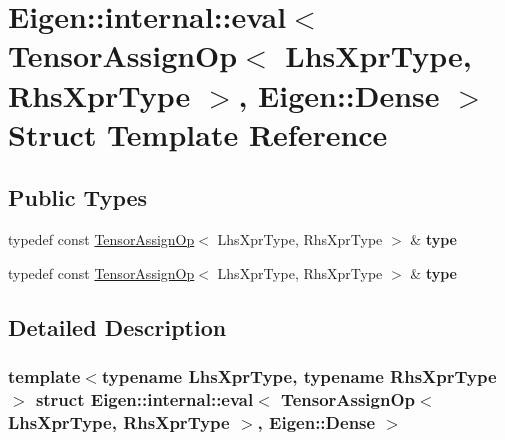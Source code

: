 \hypertarget{struct_eigen_1_1internal_1_1eval_3_01_tensor_assign_op_3_01_lhs_xpr_type_00_01_rhs_xpr_type_01_4_00_01_eigen_1_1_dense_01_4}{}\section{Eigen\+:\+:internal\+:\+:eval$<$ Tensor\+Assign\+Op$<$ Lhs\+Xpr\+Type, Rhs\+Xpr\+Type $>$, Eigen\+:\+:Dense $>$ Struct Template Reference}
\label{struct_eigen_1_1internal_1_1eval_3_01_tensor_assign_op_3_01_lhs_xpr_type_00_01_rhs_xpr_type_01_4_00_01_eigen_1_1_dense_01_4}
\subsection*{Public Types}
\begin{DoxyCompactItemize}
\item 
\mbox{\label{struct_eigen_1_1internal_1_1eval_3_01_tensor_assign_op_3_01_lhs_xpr_type_00_01_rhs_xpr_type_01_4_00_01_eigen_1_1_dense_01_4_ad5943d880c4f6f1d81767dff43e7659a}} 
typedef const \hyperlink{class_eigen_1_1_tensor_assign_op}{Tensor\+Assign\+Op}$<$ Lhs\+Xpr\+Type, Rhs\+Xpr\+Type $>$ \& {\bfseries type}
\item 
\mbox{\label{struct_eigen_1_1internal_1_1eval_3_01_tensor_assign_op_3_01_lhs_xpr_type_00_01_rhs_xpr_type_01_4_00_01_eigen_1_1_dense_01_4_ad5943d880c4f6f1d81767dff43e7659a}} 
typedef const \hyperlink{class_eigen_1_1_tensor_assign_op}{Tensor\+Assign\+Op}$<$ Lhs\+Xpr\+Type, Rhs\+Xpr\+Type $>$ \& {\bfseries type}
\end{DoxyCompactItemize}


\subsection{Detailed Description}
\subsubsection*{template$<$typename Lhs\+Xpr\+Type, typename Rhs\+Xpr\+Type$>$\newline
struct Eigen\+::internal\+::eval$<$ Tensor\+Assign\+Op$<$ Lhs\+Xpr\+Type, Rhs\+Xpr\+Type $>$, Eigen\+::\+Dense $>$}



